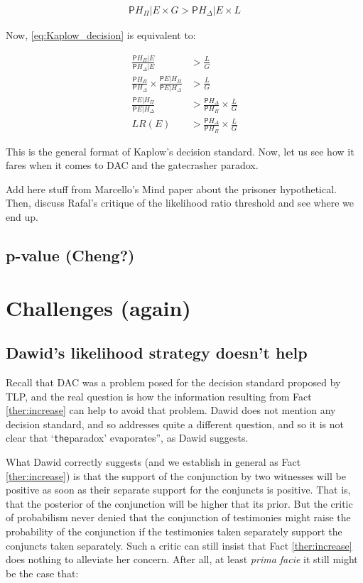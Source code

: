 \documentclass[10pt,dvipsnames,enabledeprecatedfontcommands]{scrartcl}
\newcommand{\pr}{\mathsf{P}}
\begin{document}
\begin{align}
\label{eq:Kaplow_decision}
\pr{H_\Pi\vert E}\times G > \pr{H_\Delta\vert E}\times L
\end{align}

\noindent Now, \eqref{eq:Kaplow_decision} is equivalent to:

\begin{align}
\nonumber
\frac{\pr{H_\Pi \vert E}}{\pr{H_\Delta \vert E}} & > \frac{L}{G}\\
\nonumber
\frac{\pr{H_\Pi}}{\pr{H_\Delta}} \times \frac{\pr{E\vert H_\Pi}}{\pr{E\vert H_\Delta}} &> \frac{L}{G}\\
\nonumber
\frac{\pr{E\vert H_\Pi}}{\pr{E\vert H_\Delta}}  & > \frac{\pr{H_\Delta}}{\pr{H_\Pi}} \times \frac{L}{G}\\
\label{eq:Kaplow_decision2} LR(E)  & > \frac{\pr{H_\Delta}}{\pr{H_\Pi}} \times \frac{L}{G}
\end{align}

This is the general format of Kaplow's decision standard. Now, let us
see how it fares when it comes to DAC and the gatecrasher paradox.

Add here stuff from Marcello's Mind paper about the prisoner
hypothetical. Then, discuss Rafal's critique of the likelihood ratio
threshold and see where we end up.

\subsection{p-value (Cheng?)}\label{p-value-cheng}

\section{Challenges (again)}\label{challenges-again}

\subsection{Dawid's likelihood strategy doesn't
help}\label{dawids-likelihood-strategy-doesnt-help}

Recall that DAC was a problem posed for the decision standard proposed
by TLP, and the real question is how the information resulting from Fact
\ref{ther:increase} can help to avoid that problem. Dawid does not
mention any decision standard, and so addresses quite a different
question, and so it is not clear that `\texttt{the}paradox'
evaporates'', as Dawid suggests.

What Dawid correctly suggests (and we establish in general as Fact
\ref{ther:increase}) is that the support of the conjunction by two
witnesses will be positive as soon as their separate support for the
conjuncts is positive. That is, that the posterior of the conjunction
will be higher that its prior. But the critic of probabilism never
denied that the conjunction of testimonies might raise the probability
of the conjunction if the testimonies taken separately support the
conjuncts taken separately. Such a critic can still insist that Fact
\ref{ther:increase} does nothing to alleviate her concern. After all, at
least \emph{prima facie} it still might be the case that:
\end{document}
